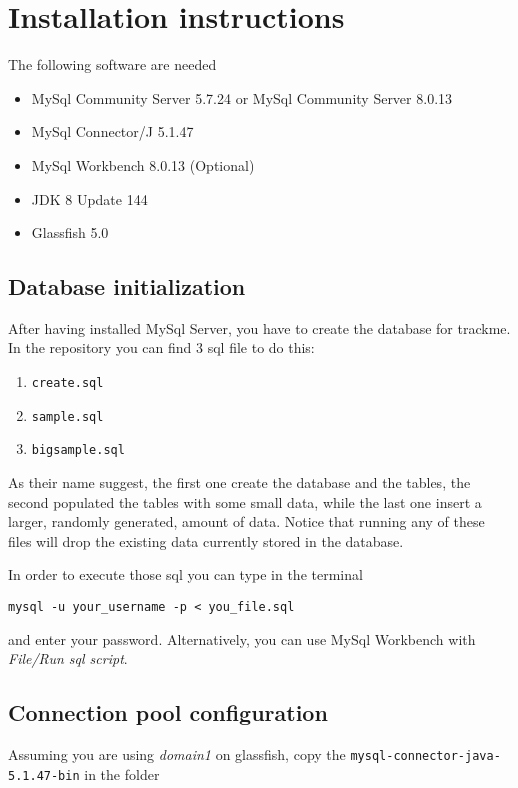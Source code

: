 \section{Installation instructions}
The following software are needed

\begin{itemize}
\item MySql Community Server  5.7.24 or MySql Community Server 8.0.13
\item MySql Connector/J 5.1.47
\item MySql Workbench 8.0.13 (Optional)
\item JDK 8 Update 144
\item Glassfish 5.0
\end{itemize}




\subsection{Database initialization}
After having installed MySql Server, you have to create the database for trackme.
In the repository you can find 3 sql file to do this:

\begin{enumerate}
\item \texttt{create.sql}
\item \texttt{sample.sql}
\item \texttt{bigsample.sql}
\end{enumerate}
As their name suggest, the first one create the database and the tables, the second populated the tables with some small data, while the last one insert a larger, randomly generated, amount of data.
Notice that running any of these files will drop the existing data currently stored in the database.
\vspace{1em}

\noindent 
In order to execute those sql you can type in the terminal

\begin{center}
\texttt{mysql -u your\_username -p \textless\ you\_file.sql}
\end{center}
and enter your password.
Alternatively, you can use MySql Workbench with \textit{File/Run sql script}.


\subsection{Connection pool configuration}
Assuming you are using \textit{domain1} on glassfish, copy the \texttt{mysql-connector-java-5.1.47-bin} in the folder

